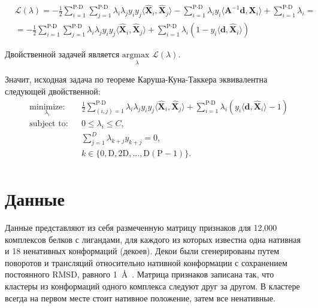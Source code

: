 \documentclass[CEJM,PDF]{Class+Reg_in_Molec_Docking} %
\begin{document}
\begin{equation}
\begin{aligned}
& \mathcal{L}(\lambda) = - \frac{1}{2} \sum_{i=1}^{\text{P}\cdot\text{D}}\sum_{j=1}^{\text{P}\cdot\text{D}} {\lambda_{i}\lambda_{j}y_{i}y_{j}\langle \widehat{\mathbf{X}}_{i}, \widehat{\mathbf{X}}_{j} \rangle} - 
\sum_{i=1}^{\text{P}\cdot\text{D}}{\lambda_{i}y_{i}\langle \mathbf{A}^{-1}\mathbf{d}, \mathbf{X}_{i} \rangle} + \sum_{i=1}^{\text{P}\cdot\text{D}}{\lambda_{i}} = \\
& = - \frac{1}{2} \sum_{i=1}^{\text{P}\cdot\text{D}}\sum_{j=1}^{\text{P}\cdot\text{D}} {\lambda_{i}\lambda_{j}y_{i}y_{j}\langle \widehat{\mathbf{X}}_{i}, \widehat{\mathbf{X}}_{j}  \rangle} + 
\sum_{i=1}^{\text{P}\cdot\text{D}}{\lambda_{i} \left(1  - y_{i}\langle \mathbf{d}, \widehat{\mathbf{X}}_{i} \rangle \right)}
\end{aligned}
\end{equation}

Двойственной задачей является $\underset{\lambda}{\text{argmax }} \mathcal{L}(\lambda)$.

Значит, исходная задача по теореме Каруша-Куна-Таккера эквивалентна следующей двойственной:
\begin{equation}\label{Class+Regres_final}
\begin{aligned}
& \underset{\lambda_{i}}{\text{minimize:}}
& & \frac{1}{2}\sum\limits_{(i,j)=1}^{\text{P}\cdot\text{D}}\lambda_{i}\lambda_{j}y_{i}y_{j}\langle \widehat{\mathbf{X}}_{i},\widehat{\mathbf{X}}_{j}\rangle + \sum_{i=1}^{\text{P}\cdot\text{D}}{\lambda_{i} \left(y_{i}\langle \mathbf{d}, \widehat{\mathbf{X}}_{i} \rangle - 1 \right)} \\
& \text{subject to:}
& & 0\leq\lambda_{i} \leq C, \\
&&& \sum_{j=1}^D{\lambda_{k+j}y_{k+j}} = 0, \\
&&& k \in \{ 0,\text{D},2\text{D},\hdots,\text{D}(\text{P}-1) \}. \\
\end{aligned}
\end{equation}

\section{Данные}

Данные представляют из себя размеченную матрицу признаков для 12,000 комплексов белков с лигандами, для каждого из которых известна одна нативная и 18 ненативных конформаций (декоев). Декои были сгенерированы путем поворотов и трансляций относительно нативной конформации с сохранением постоянного RMSD, равного 1~\AA~. Матрица признаков записана так, что кластеры из конформаций одного комплекса следуют друг за другом. 
В кластере всегда на первом месте стоит нативное положение, затем все ненативные.
\end{document}
